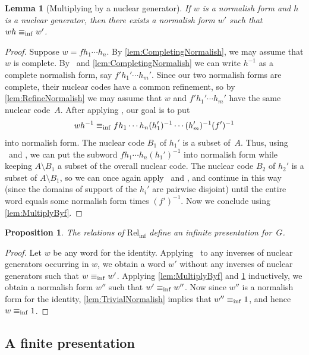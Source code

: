 \documentclass[11pt,letterpaper]{amsart}
\newtheorem{proposition}[theorem]{Proposition}
\newtheorem{lemma}[theorem]{Lemma}
\theoremstyle{definition}
\begin{document}
\begin{lemma}[Multiplying by a nuclear generator]\label{lem:MultiplyNormalish}
If $w$ is a normalish form and $h$ is a nuclear generator, then there exists a normalish form $w'$ such that $wh\equiv_{\mathrm{inf}} w'$.
\end{lemma}

\begin{proof}
Suppose $w=f h_1\cdots h_n$.  By \cref{lem:CompletingNormalish}, we may assume that $w$ is complete. By \Inv\ and \cref{lem:CompletingNormalish} we can write $h^{-1}$ as a complete normalish form, say $f' h_1'\cdots h_m'$. Since our two normalish forms are complete, their nuclear codes have a common refinement, so by \cref{lem:RefineNormalish} we may assume that $w$ and $f'h_1'\cdots h_m'$ have the same nuclear code~$A$. After applying \DisjComm, our goal is to put
\[
wh^{-1} \equiv_{\mathrm{inf}} f h_1\cdots h_n (h_1')^{-1}\cdots (h_m')^{-1}(f')^{-1}
\]
into normalish form. The nuclear code $B_1$ of $h_1'$ is a subset of~$A$. Thus, using \Prod\ and \VRel, we can put the subword $f h_1\cdots h_n (h_1')^{-1}$ into normalish form while keeping $A\setminus B_1$ a subset of the overall nuclear code. The nuclear code $B_2$ of $h_2'$ is a subset of $A\setminus B_1$, so we can once again apply \Prod\ and \VRel, and continue in this way (since the domains of support of the $h_i'$ are pairwise disjoint) until the entire word equals some normalish form times $(f')^{-1}$. Now we conclude using \cref{lem:MultiplyByf}.
\end{proof}

\begin{proposition}\label{prop:RelInfSuffices}
The relations of\/ $\mathrm{Rel}_{\mathrm{inf}}$ define an infinite presentation for~$G$.
\end{proposition}
\begin{proof}
Let $w$ be any word for the identity.  Applying \Inv\ to any inverses of nuclear generators occurring in $w$, we obtain a word $w'$ without any inverses of nuclear generators such that $w\equiv_{\mathrm{inf}} w'$.  Applying \cref{lem:MultiplyByf} and \cref{lem:MultiplyNormalish} inductively, we obtain a normalish form $w''$ such that $w'\equiv_{\mathrm{inf}} w''$.  Now since $w''$ is a normalish form for the identity, \cref{lem:TrivialNormalish} implies that $w''\equiv_{\mathrm{inf}} 1$, and hence $w\equiv_{\mathrm{inf}} 1$.
\end{proof}


\subsection{A finite presentation}\label{ssec:finitepres}
\end{document}
